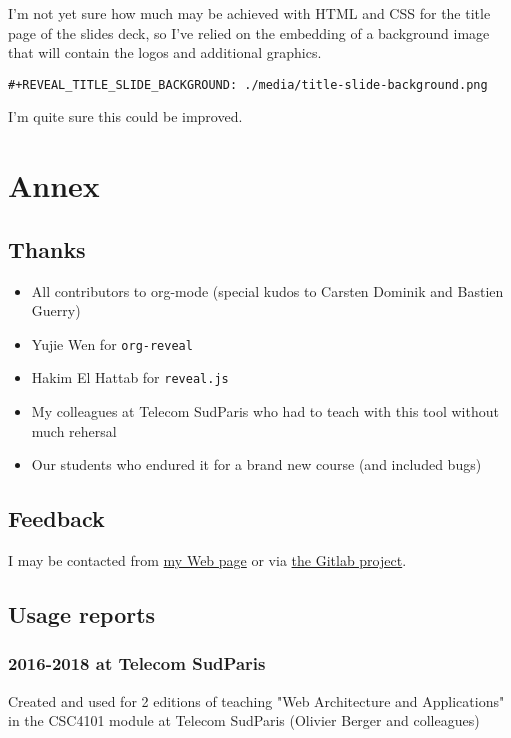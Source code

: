 \documentclass[a4paper]{article}
\begin{document}
I'm not yet sure how much may be achieved with HTML and CSS for the
title page of the slides deck, so I've relied on the embedding of a
background image that will contain the logos and additional graphics. 

\begin{verbatim}
#+REVEAL_TITLE_SLIDE_BACKGROUND: ./media/title-slide-background.png
\end{verbatim}

I'm quite sure this could be improved.


\section{Annex}
\label{sec:org93b8a44}

\subsection{Thanks}
\label{sec:org99ae559}

\begin{itemize}
\item All contributors to org-mode (special kudos to Carsten Dominik and Bastien Guerry)
\item Yujie Wen for \texttt{org-reveal}
\item Hakim El Hattab for \texttt{reveal.js}
\item My colleagues at Telecom SudParis who had to teach with this tool without much rehersal
\item Our students who endured it for a brand new course (and included bugs)
\end{itemize}

\subsection{Feedback}
\label{sec:orgac20254}

I may be contacted from \href{http://www-public.tem-tsp.eu/\~berger\_o/\#sec-3}{my Web page} or via \href{https://gitlab.com/olberger/org-teaching}{the Gitlab project}.

\subsection{Usage reports}
\label{sec:org66e5de6}

\subsubsection{2016-2018 at Telecom SudParis}
\label{sec:orga126d46}

Created and used for 2 editions of teaching "Web Architecture and Applications" in the CSC4101 module at Telecom SudParis (Olivier Berger and colleagues)
\end{document}
